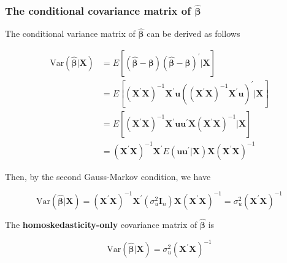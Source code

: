\documentclass[a4paper,11pt]{article}
\newcommand{\var}{\mathrm{Var}}
\begin{document}
\subsubsection*{The conditional covariance matrix of \(\hat{\boldsymbol{\beta}}\)}
\label{sec:org743993f}
The conditional variance matrix of \(\hat{\boldsymbol{\beta}}\) can be
derived as follows
\begin{LaTeX}
\begin{equation*}
\begin{split}
\var(\hat{\boldsymbol{\beta}} | \mathbf{X}) &= E\left[ (\hat{\boldsymbol{\beta}} - \boldsymbol{\beta})(\hat{\boldsymbol{\beta}} - \boldsymbol{\beta})^{\prime} | \mathbf{X}\right] \\
&= E\left[ \left(\mathbf{X}^{\prime} \mathbf{X}\right)^{-1} \mathbf{X}^{\prime} \mathbf{u} \left(\left(\mathbf{X}^{\prime} \mathbf{X}\right)^{-1} \mathbf{X}^{\prime} \mathbf{u} \right)^{\prime} | \mathbf{X} \right] \\
&= E\left[ \left(\mathbf{X}^{\prime} \mathbf{X}\right)^{-1} \mathbf{X}^{\prime} \mathbf{u} \mathbf{u}^{\prime} \mathbf{X} (\mathbf{X}^{\prime} \mathbf{X})^{-1} | \mathbf{X} \right] \\
&= \left(\mathbf{X}^{\prime} \mathbf{X}\right)^{-1} \mathbf{X}^{\prime} E(\mathbf{uu}^{\prime} | \mathbf{X}) \mathbf{X} (\mathbf{X}^{\prime} \mathbf{X})^{-1}
\end{split}
\end{equation*}
\end{LaTeX}

Then, by the second Gauss-Markov condition, we have
\begin{LaTeX}
\begin{equation*}
\var(\hat{\boldsymbol{\beta}} | \mathbf{X}) = \left(\mathbf{X}^{\prime} \mathbf{X}\right)^{-1} \mathbf{X}^{\prime} (\sigma^2_u \mathbf{I}_n) \mathbf{X} (\mathbf{X}^{\prime} \mathbf{X})^{-1} = \sigma^2_u (\mathbf{X}^{\prime} \mathbf{X})^{-1}
\end{equation*}
\end{LaTeX}

The \textbf{homoskedasticity-only} covariance matrix of \(\hat{\boldsymbol{\beta}}\) is
\begin{LaTeX}
\begin{equation}
\label{eq:varbhat-hm}
\var(\hat{\boldsymbol{\beta}} | \mathbf{X}) = \sigma^2_u (\mathbf{X}^{\prime} \mathbf{X})^{-1}
\end{equation}
\end{LaTeX}
\end{document}

